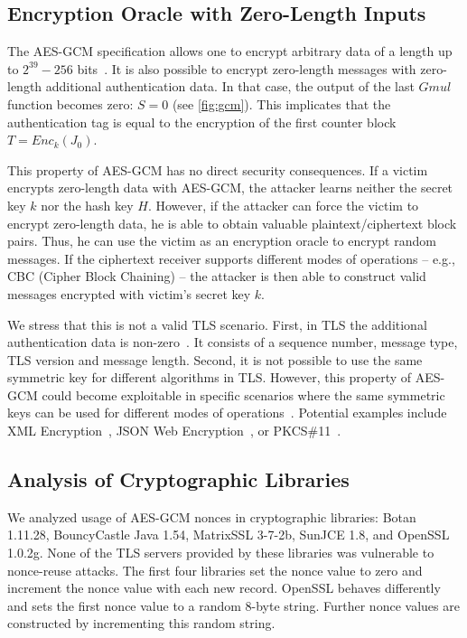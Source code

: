 \subsection{Encryption Oracle with Zero-Length Inputs}
The AES-GCM specification allows one to encrypt arbitrary data of a length up to $2^{39}-256$ bits~\cite{gcm}.
It is also possible to encrypt zero-length messages with zero-length additional authentication data. In that case, the output of the last $Gmul$
function becomes zero: $S=0$ (see \cref{fig:gcm}). This implicates that the authentication tag is equal to the encryption of the first counter block $T = Enc_k(J_0)$.

This property of AES-GCM has no direct security consequences. If a victim encrypts zero-length data with AES-GCM, the attacker learns neither the secret key $k$ nor the
hash key $H$. However, if the attacker can force the victim to encrypt zero-length data, he is able to obtain valuable plaintext/ciphertext block pairs.
Thus, he can use the victim as an encryption oracle to encrypt random messages.
If the ciphertext receiver supports different modes of operations -- e.g., CBC (Cipher Block Chaining) -- the attacker is then able to construct valid messages encrypted with victim's
secret key $k$.

We stress that this is not a valid TLS scenario. First, in TLS the additional authentication data is non-zero~\cite{rfc5246}. It consists of a sequence number, message type, TLS version and message length.
Second, it is not possible to use the same symmetric key for different algorithms in TLS.
However, this property of AES-GCM could become exploitable in specific scenarios where the same symmetric keys can be used for different modes of operations~\cite{jager13one}.
Potential examples include XML Encryption~\cite{Eastlake2012},
JSON Web Encryption~\cite{rfc7516}, or PKCS\#11~\cite{Griffin2014}.


\subsection{Analysis of Cryptographic Libraries}
We analyzed usage of AES-GCM nonces in cryptographic libraries: Botan 1.11.28, BouncyCastle Java 1.54, MatrixSSL 3-7-2b, SunJCE 1.8, and OpenSSL 1.0.2g. 
None of the TLS servers provided by these libraries was vulnerable to nonce-reuse attacks. The first four libraries set the nonce value to zero
and increment the nonce value with each new record. OpenSSL behaves differently and sets the first nonce value to a random
8-byte string. Further nonce values are constructed by incrementing this random string.

